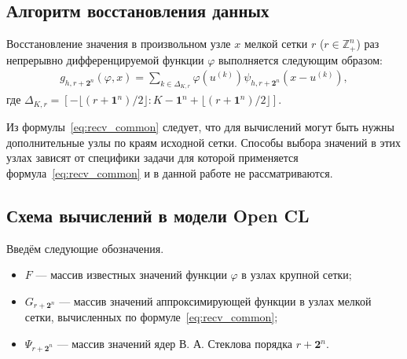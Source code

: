 
\label{sec:func_recv}

\subsection*{Алгоритм восстановления данных}

Восстановление значения в произвольном  узле $x$    мелкой сетки %
$r$ ($r\in\mathbb{Z}_+^n$) раз непрерывно дифференцируемой функции $\varphi$
выполняется следующим образом: 
\begin{gather}
  \label{eq:recv_common}
  g_{h,r+\mathbf{2}^n}(\varphi, x) = \sum_{k\in  \Delta_{K,r}}
   \varphi(u^{(k)})
   \psi_{h, r+\mathbf{2}^n}(x-u^{(k)}),%
 \end{gather}
 где $ \Delta_{K,r}=\left[-\lfloor{(r+\mathbf{1}^n)/2}\rfloor:
   K-\mathbf{1}^n+\lfloor{(r+\mathbf{1}^n)/2}\rfloor\right]$.  %

 
Из формулы~\eqref{eq:recv_common} следует, что для вычислений
могут быть нужны дополнительные
узлы по краям исходной сетки.
Способы выбора значений в этих узлах зависят
от специфики задачи для которой применяется формула~\eqref{eq:recv_common}  
и в данной работе не рассматриваются.


\subsection*{Схема вычислений в модели Open CL}


Введём  следующие обозначения.
\begin{itemize}

\item
  $F$  --- массив  известных значений функции $\varphi$
  в узлах крупной сетки;

\item
  $G_{r+\mathbf{2}^n}$ --- массив
  значений аппроксимирующей функции в узлах мелкой сетки,
  вычисленных по формуле~\eqref{eq:recv_common};

\item
  $\Psi_{r+\mathbf{2}^n}$ --- массив  значений ядер В. А. Стеклова порядка $r+\mathbf{2}^n$.

\end{itemize}


